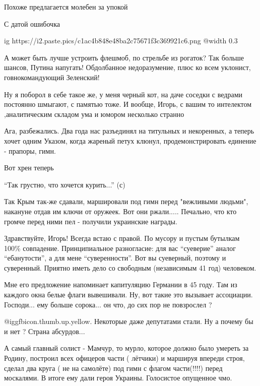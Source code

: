 \begin{itemize} %

Похоже предлагается молебен за упокой


С датой ошибочка

\ifcmt
  ig https://i2.paste.pics/c1ac4b848e48ba2c75671f3c369921c6.png
  @width 0.3
\fi


А может быть лучше устроить флешмоб, по стрельбе из рогаток? Так больше шансов,
Путина напугать! Обдолбанное недоразумение, плюс ко всем уклонист,
говнокомандующий Зеленский!


Ну я поборол в себе такое же, у меня черный кот, на даче соседки с ведрами
постоянно шмыгают, с памятью тоже. И вообще, Игорь, с вашим то интелектом
,аналитическим складом ума и юмором несколько странно


Ага, разбежались. Два года нас разъединял на титульных и некоренных, а теперь
хочет одним Указом, когда жареный петух клюнул, продемонстрировать  
единение - прапоры, гимн.

Вот хрен теперь


\enquote{Так грустно, что хочется курить...} (с)


Так Крым так-же сдавали, маршировали под гимн перед "вежливыми людьми",
накануне отдав им ключи от оружеек. Вот они ржали..... Печально, что кто громче
перед ними пел - получили украинские награды.


Здравствуйте, Игорь! Всегда встаю с правой. По мусору и пустым бутылкам 100\%
совпадение. Принципиальное разногласие: для вас \enquote{суеверие} аналог \enquote{ебанутости},
а для мене \enquote{суверенности}. Вот вы суеверный, поэтому и суверенный. Приятно
иметь дело со свободным (независимым 41 год) человеком.


Мне его предложение напоминает капитуляцию Германии в 45 году.  Там из каждого
окна белые флаги вывешивали.  Ну, вот такие это вызывает ассоциации.
Господи... ему больше сорока... он что, до сих пор не повзрослел ?


@igg{fbicon.thumb.up.yellow}.  Некоторые даже депутатами стали.  Ну а почему
бы и нет ?   Страна абсурдов...


А самый главный солист - Мамчур, то мурло, которое должно было умереть за
Родину, построил всех офицеров части ( лётчики) и маршируя впереди строя,
сделал два круга ( не на самолёте) под гимн с флагом части(!!!!) перед
москалями. В итоге ему дали героя Украины. Голосистое опущенное чмо.

\end{itemize} %
